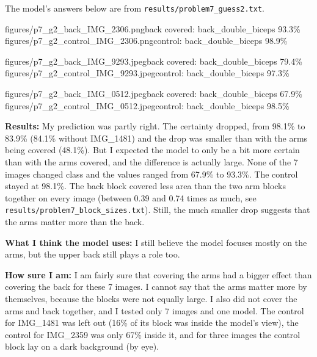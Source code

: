 \documentclass[11pt]{article}
\begin{document}
The model's answers below are from \texttt{results/problem7\_guess2.txt}.

           {figures/p7_g2_back_IMG_2306.png}{back covered: back\_double\_biceps 93.3\%}
           {figures/p7_g2_control_IMG_2306.png}{control: back\_double\_biceps 98.9\%}

           {figures/p7_g2_back_IMG_9293.jpeg}{back covered: back\_double\_biceps 79.4\%}
           {figures/p7_g2_control_IMG_9293.jpeg}{control: back\_double\_biceps 97.3\%}

           {figures/p7_g2_back_IMG_0512.jpeg}{back covered: back\_double\_biceps 67.9\%}
           {figures/p7_g2_control_IMG_0512.jpeg}{control: back\_double\_biceps 98.5\%}


\textbf{Results:} My prediction was partly right. The certainty dropped, from 98.1\% to 83.9\% (84.1\% without IMG\_1481) and the drop was smaller than with the arms being covered (48.1\%). But I expected the model to only be a bit more certain than with the arms covered, and the difference is actually large. None of the 7 images changed class and the values ranged from 67.9\% to 93.3\%. The control stayed at 98.1\%. The back block covered less area than the two arm blocks together on every image (between 0.39 and 0.74 times as much, see \texttt{results/problem7\_block\_sizes.txt}). Still, the much smaller drop suggests that the arms matter more than the back.

\textbf{What I think the model uses:} I still believe the model focuses mostly on the arms, but the upper back still plays a role too.

\textbf{How sure I am:} I am fairly sure that covering the arms had a bigger effect than covering the back for these 7 images. I cannot say that the arms matter more by themselves, because the blocks were not equally large. I also did not cover the arms and back together, and I tested only 7 images and one model. The control for IMG\_1481 was left out (16\% of its block was inside the model's view), the control for IMG\_2359 was only 67\% inside it, and for three images the control block lay on a dark background (by eye).
\end{document}
